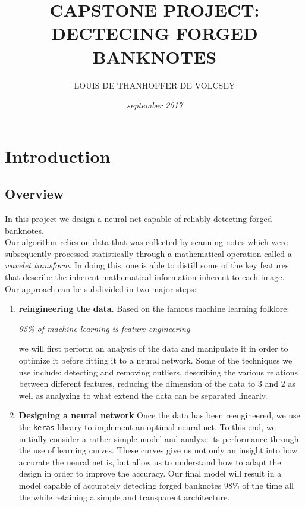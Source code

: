 \documentclass[14pt]{article}
\theoremstyle{plain}
\theoremstyle{definition}
\begin{document}
\title{\textbf{CAPSTONE PROJECT: DECTECING FORGED BANKNOTES}}
\author{LOUIS DE THANHOFFER DE VOLCSEY}
\date{\emph{september 2017}}
\maketitle	
\vspace{1in}

\pagestyle{fancy}
 
 \lfoot{}  \cfoot{}

\noindent\hrulefill
\tableofcontents{}
\noindent\hrulefill
\newpage 
\section{Introduction}
\subsection{Overview}
In this project we design a neural net capable of reliably detecting forged banknotes.\\ Our algorithm relies on data that was collected by scanning notes which were subsequently processed statistically through a mathematical operation called a \emph{wavelet transform}. In doing this, one is able to distill some of the key features that describe the inherent mathematical information inherent to each image.\\ 
Our approach can be subdivided in two major steps:
\begin{enumerate}
\item {\bf reingineering the data}. Based on the famous machine learning folklore:
\begin{center}
\emph{95\% of machine learning is feature engineering}	
\end{center}
we will first perform an analysis of the data and manipulate it in order to optimize it  before fitting it to a neural network. 
Some of the techniques we use include:  detecting and removing outliers, describing the various relations between different features, reducing the dimension of the data to 3 and 2 as well as analyzing to what extend the data can be separated linearly.
\item
{\bf Designing a neural network}
Once the data has been reengineered, we use the \texttt{keras} library to implement an optimal neural net. To this end, we initially consider a rather simple model and analyze its performance through the use of learning curves. These curves give us not only an insight into how accurate the neural net is, but allow us to understand how to adapt the design in order to improve the accuracy. Our final model will result in a model capable of accurately detecting forged banknotes 98\% of the time all the while retaining a simple and transparent architecture.
\end{enumerate}
\end{document}
